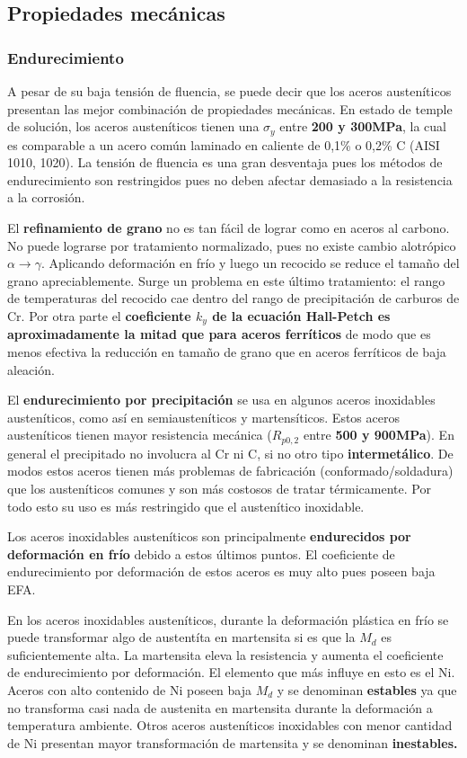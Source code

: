 \subsection{Propiedades mecánicas}

\subsubsection{Endurecimiento}
A pesar de su baja tensión de fluencia, se puede decir que los aceros austeníticos presentan las mejor combinación de propiedades mecánicas. En estado de temple de solución, los aceros austeníticos tienen una $\sigma_y$ entre \textbf{200 y 300MPa}, la cual es comparable a un acero común laminado en caliente de 0,1\% o 0,2\% C (AISI 1010, 1020). La tensión de fluencia es una gran desventaja pues los métodos de endurecimiento son restringidos pues no deben afectar demasiado a la resistencia a la corrosión.

El \textbf{refinamiento de grano} no es tan fácil de lograr como en aceros al carbono. No puede lograrse por tratamiento normalizado, pues no existe cambio alotrópico $\alpha \rightarrow \gamma$. Aplicando deformación en frío y luego un recocido se reduce el tamaño del grano apreciablemente. Surge un problema en este último tratamiento: el rango de temperaturas del recocido cae dentro del rango de precipitación de carburos de Cr. Por otra parte el \textbf{coeficiente $k_y$ de la ecuación Hall-Petch es aproximadamente la mitad que para aceros ferríticos} de modo que es menos efectiva la reducción en tamaño de grano que en aceros ferríticos de baja aleación.

El \textbf{endurecimiento por precipitación} se usa en algunos aceros inoxidables austeníticos, como así en semiausteníticos y martensíticos. Estos aceros austeníticos tienen mayor resistencia mecánica ($R_{p0,2}$ entre \textbf{500 y 900MPa}). En general el precipitado no involucra al Cr ni C, si no otro tipo \textbf{intermetálico}. De modos estos aceros tienen más problemas de fabricación (conformado/soldadura) que los austeníticos comunes y son más costosos de tratar térmicamente. Por todo esto su uso es más restringido que el austenítico inoxidable. 

Los aceros inoxidables austeníticos son principalmente \textbf{endurecidos por deformación en frío} debido a estos últimos puntos. El coeficiente de endurecimiento por deformación de estos aceros es muy alto pues poseen baja EFA.

En los aceros inoxidables austeníticos, durante la deformación plástica en frío se puede transformar algo de austentíta en martensita si es que la $M_d$ es suficientemente alta. La martensita eleva la resistencia y aumenta el coeficiente de endurecimiento por deformación. El elemento que más influye en esto es el Ni. Aceros con alto contenido de Ni poseen baja $M_d$ y se denominan \textbf{estables} ya que no transforma casi nada de austenita en martensita durante la deformación a temperatura ambiente. Otros aceros austeníticos inoxidables con menor cantidad de Ni presentan mayor transformación de martensita y se denominan \textbf{inestables.}

